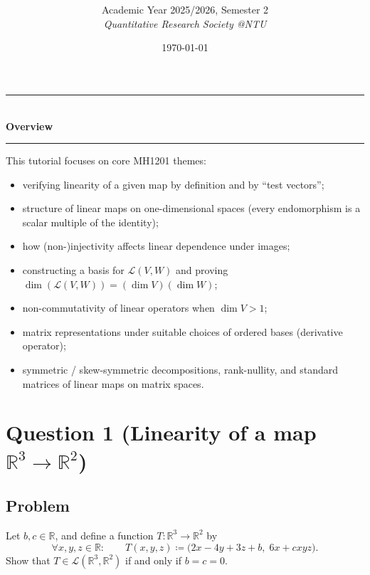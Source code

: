 \documentclass[12pt]{article}
\title{
\CourseCode\ \CourseName \\[0.3em]
\large \DocType
}
\author{
  Academic Year 2025/2026, Semester 2 \\[0.25em]
  \textit{Quantitative Research Society @NTU}
}
\date{\today}
\newcommand{\R}{\mathbb{R}}
\newcommand{\cL}{\mathcal{L}}
\begin{document}
\maketitle
\thispagestyle{plainfirst}
\pagestyle{main}
\bigskip

\begin{center}
  \rule{0.8\textwidth}{0.4pt}\\[4pt]
  \textbf{Overview}\\[2pt]
  \rule{0.8\textwidth}{0.4pt}
\end{center}

\noindent
This tutorial focuses on core MH1201 themes:
\begin{itemize}[leftmargin=*]
  \item verifying linearity of a given map by definition and by ``test vectors'';
  \item structure of linear maps on one-dimensional spaces (every endomorphism is a scalar multiple of the identity);
  \item how (non-)injectivity affects linear dependence under images;
  \item constructing a basis for $\cL(V,W)$ and proving $\dim(\cL(V,W)) = (\dim V)(\dim W)$;
  \item non-commutativity of linear operators when $\dim V>1$;
  \item matrix representations under suitable choices of ordered bases (derivative operator);
  \item symmetric / skew-symmetric decompositions, rank-nullity, and standard matrices of linear maps on matrix spaces.
\end{itemize}

\bigskip

\newpage
\tableofcontents
\newpage

\section{Question 1 (Linearity of a map $\R^3\to\R^2$)}
\subsection{Problem}
Let $b,c\in\R$, and define a function $T:\R^3\to\R^2$ by
\[
\forall x,y,z\in\R:\qquad T(x,y,z)\coloneqq \bigl(2x-4y+3z+b,\; 6x + cxyz\bigr).
\]
Show that $T\in \cL(\R^3,\R^2)$ if and only if $b=c=0$.
\end{document}
